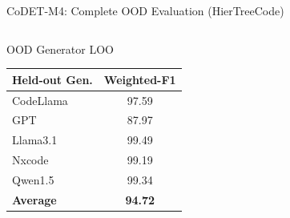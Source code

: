 \documentclass[aspectratio=169, 10pt]{beamer}
\begin{document}
\begin{frame}{CoDET-M4: Complete OOD Evaluation (HierTreeCode)}
\begin{columns}[T]
\begin{block}{OOD Generator LOO}
\centering\footnotesize
\begin{tabular}{lc}
\toprule
\textbf{Held-out Gen.} & \textbf{Weighted-F1} \\
\midrule
CodeLlama & 97.59 \\
GPT & 87.97 \\
Llama3.1 & 99.49 \\
Nxcode & 99.19 \\
Qwen1.5 & 99.34 \\
\midrule
\textbf{Average} & \textbf{94.72} \\
\bottomrule
\end{tabular}
\end{block}
\end{columns}
\end{frame}
\end{document}

